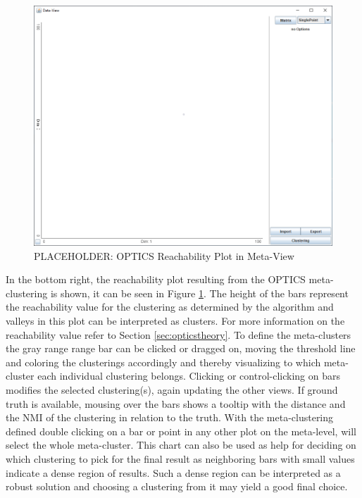 \documentclass[
	a4paper,
	english,
	twoside,
	openright,               
	11pt                            
	]{report}
\begin{document}
\begin{figure}[h]
	\centering
	\includegraphics[scale=.45]{data-view}
	\caption{PLACEHOLDER: OPTICS Reachability Plot in Meta-View }
	\label{fig:opticsplot}
\end{figure}

In the bottom right, the reachability plot resulting from the OPTICS meta-clustering is shown, it can be seen in Figure \ref{fig:opticsplot}. The height of the bars represent the reachability value for the clustering as determined by the algorithm and valleys in this plot can be interpreted as clusters. For more information on the reachability value refer to Section \ref{sec:opticstheory}. To define the meta-clusters the gray range range bar can be clicked or dragged on, moving the threshold line and coloring the clusterings accordingly and thereby visualizing to which meta-cluster each individual clustering belongs. Clicking or control-clicking on bars modifies the selected clustering(s), again updating the other views. If ground truth is available, mousing over the bars shows a tooltip with the distance and the NMI of the clustering in relation to the truth. With the meta-clustering defined double clicking on a bar or point in any other plot on the meta-level, will select the whole meta-cluster. This chart can also be used as help for deciding on which clustering to pick for the final result as neighboring bars with small values indicate a dense region of results. Such a dense region can be interpreted as a robust solution and choosing a clustering from it may yield a good final choice.
\end{document}
